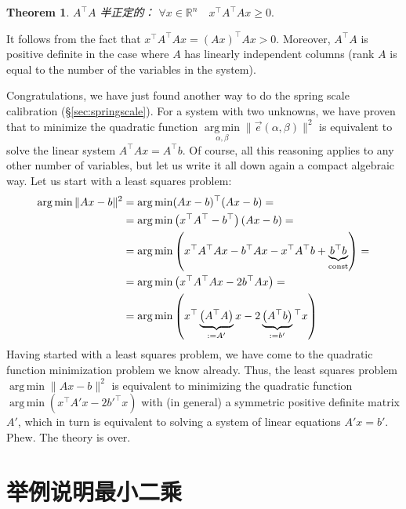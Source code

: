 \documentclass[notitlepage,oneside]{book}
\DeclareMathOperator*{\argmin}{arg\,min}
\newtheorem{theorem}{Theorem}
\begin{document}
\begin{theorem}
	$A^\top A$ 半正定的： $\forall x\in \mathbb R^n\quad x^\top A^\top A x \geq 0.$
\end{theorem}
It follows from the fact that $x^\top A^\top A x = (A x)^\top A x > 0$.
Moreover, $A^\top A$ is positive definite in the case where $A$ has linearly independent columns (rank $A$ is equal to the number of the variables in the system).

\vspace{5mm}

Congratulations, we have just found another way to do the spring scale calibration (\S\ref{sec:springscale}).
For a system with two unknowns, we have proven that to minimize the quadratic function $\argmin\limits_{\alpha, \beta} \|\vec{e}(\alpha, \beta)\|^2$
is equivalent to solve the linear system $A^\top A x = A^\top b$.
Of course, all this reasoning applies to any other number of variables, but let us write it all down again a compact algebraic way.
Let us start with a least squares problem:
\begin{align*}
\argmin \| Ax - b \|^2 &= \argmin (Ax-b)^\top (Ax-b) =\\
& = \argmin\left(x^\top A^\top - b^\top\right)(Ax-b) = \\
& = \argmin\left(x^\top A^\top A x - b^\top Ax - x^\top A^\top b + \underbrace{b^\top b}_{\rm const}\right)=\\
& = \argmin\left(x^\top A^\top A x - 2b^\top Ax\right) = \\
& = \argmin\left(x^\top \underbrace{\left(A^\top A\right)}_{:=A'} x - 2\underbrace{\left(A^\top b\right)}_{:=b'}\phantom{}^\top x\right)
\end{align*}
Having started with a least squares problem, we have come to the quadratic function minimization problem we know already.
Thus, the least squares problem $\argmin \| Ax - b \|^2$  is equivalent to minimizing the quadratic function $\argmin \left(x^\top A' x - 2b'^\top x\right)$ 
with (in general) a symmetric positive definite matrix $A'$, which in turn is equivalent to solving a system of linear equations $A'x = b'$. Phew. The theory is over.





\chapter{举例说明最小二乘}
\end{document}
